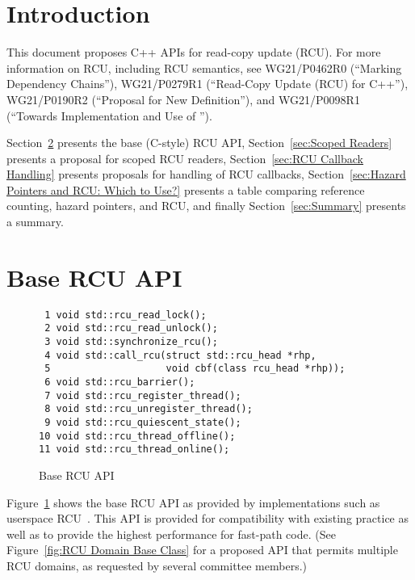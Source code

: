 \documentclass[letterpaper,10pt]{article}
\begin{document}
\section{Introduction}
\label{sec:Introduction}

This document proposes C++ APIs for read-copy update (RCU).
For more information on RCU, including RCU semantics, see
WG21/P0462R0 (``Marking  Dependency Chains''),
WG21/P0279R1 (``Read-Copy Update (RCU) for C++''),
WG21/P0190R2 (``Proposal for New  Definition''),
and
WG21/P0098R1 (``Towards Implementation and Use of '').

Section~\ref{sec:Base RCU API} presents the base (C-style) RCU API,
Section~\ref{sec:Scoped Readers} presents a proposal for scoped RCU readers,
Section~\ref{sec:RCU Callback Handling} presents proposals for handling of
RCU callbacks,
Section~\ref{sec:Hazard Pointers and RCU: Which to Use?} presents a
table comparing reference counting, hazard pointers, and RCU, and finally
Section~\ref{sec:Summary} presents a summary.

\section{Base RCU API}
\label{sec:Base RCU API}

\begin{figure}[tbp]
{ \scriptsize
\begin{verbatim}
 1 void std::rcu_read_lock();
 2 void std::rcu_read_unlock();
 3 void std::synchronize_rcu();
 4 void std::call_rcu(struct std::rcu_head *rhp,
 5                    void cbf(class rcu_head *rhp));
 6 void std::rcu_barrier();
 7 void std::rcu_register_thread();
 8 void std::rcu_unregister_thread();
 9 void std::rcu_quiescent_state();
10 void std::rcu_thread_offline();
11 void std::rcu_thread_online();
\end{verbatim}
}
\caption{Base RCU API}
\label{fig:Base RCU API}
\end{figure}

Figure~\ref{fig:Base RCU API}
shows the base RCU API as provided by implementations such as
userspace RCU~\cite{MathieuDesnoyers2009URCU,PaulMcKenney2013LWNURCU}.
This API is provided for compatibility with existing practice as
well as to provide the highest performance for fast-path code.
(See Figure~\ref{fig:RCU Domain Base Class} for a proposed API that
permits multiple RCU domains, as requested by several committee members.)
\end{document}
